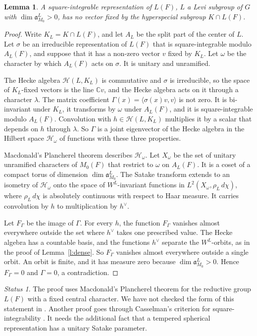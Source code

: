 \documentclass[12pt,letterpaper]{article}
\numberwithin{equation}{section}
\theoremstyle{plain}
\newtheorem{lemma}[theorem]{Lemma}
\theoremstyle{definition}
\theoremstyle{remark}
\newtheorem{status}[theorem]{Status}
\newcommand{\Hc}{\mathcal{H}}
\newcommand{\fa}{\mathfrak{a}}
\newcommand{\ip}[1]{\langle #1\rangle}
\begin{document}
\begin{lemma}\label{l:noDS}
A square-integrable representation of $L(F)$, $L$ a Levi subgroup of $G$ with $\dim\fa_{M_0}^L>0$, has no vector fixed by the hyperspecial subgroup $K\cap L(F)$.
\end{lemma}

\begin{proof}
Write $K_L=K\cap L(F)$, and let $A_L$ be the split part of the center of $L$. Let $\sigma$ be an irreducible representation of $L(F)$ that is square-integrable modulo $A_L(F)$, and suppose that it has a non-zero vector $v$ fixed by $K_L$. Let $\omega$ be the character by which $A_L(F)$ acts on $\sigma$. It is unitary and unramified.

The Hecke algebra $\Hc(L,K_L)$ is commutative and $\sigma$ is irreducible, so the space of $K_L$-fixed vectors is the line $\mathbb{C}v$, and the Hecke algebra acts on it through a character $\lambda$. The matrix coefficient $\Gamma(x)=\ip{\sigma(x)v,v}$ is not zero. It is bi-invariant under $K_L$, it transforms by $\omega$ under $A_L(F)$, and it is square-integrable modulo $A_L(F)$. Convolution with $h\in\Hc(L,K_L)$ multiplies it by a scalar that depends on $h$ through $\lambda$. So $\Gamma$ is a joint eigenvector of the Hecke algebra in the Hilbert space $\mathcal H_\omega$ of functions with these three properties.

Macdonald's Plancherel theorem \cite{Ma71} describes $\mathcal H_\omega$. Let $X_\omega$ be the set of unitary unramified characters of $M_0(F)$ that restrict to $\omega$ on $A_L(F)$. It is a coset of a compact torus of dimension $\dim\fa_{M_0}^L$. The Satake transform extends to an isometry of $\mathcal H_\omega$ onto the space of $W^L$-invariant functions in $L^2(X_\omega,\rho_L\,d\chi)$, where $\rho_L\,d\chi$ is absolutely continuous with respect to Haar measure. It carries convolution by $h$ to multiplication by $h^\vee$.

Let $F_\Gamma$ be the image of $\Gamma$. For every $h$, the function $F_\Gamma$ vanishes almost everywhere outside the set where $h^\vee$ takes one prescribed value. The Hecke algebra has a countable basis, and the functions $h^\vee$ separate the $W^L$-orbits, as in the proof of Lemma~\ref{l:dense}. So $F_\Gamma$ vanishes almost everywhere outside a single orbit. An orbit is finite, and it has measure zero because $\dim\fa_{M_0}^L>0$. Hence $F_\Gamma=0$ and $\Gamma=0$, a contradiction.
\end{proof}

\begin{status}
The proof uses Macdonald's Plancherel theorem for the reductive group $L(F)$ with a fixed central character. We have not checked the form of this statement in \cite{Ma71}. Another proof goes through Casselman's criterion for square-integrability \cite{Ca95}. It needs the additional fact that a tempered spherical representation has a unitary Satake parameter.
\end{status}
\end{document}
